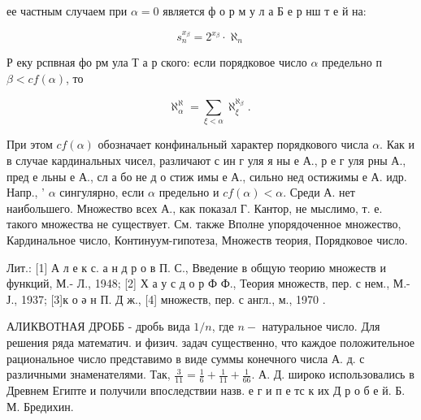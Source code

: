 \documentclass[10pt]{article}
\begin{document}
ее частным случаем при $\alpha=0$ является ф о р м у л а Б е р нш т е й на:



\[

s_{n}^{x_{\beta}}=2^{x_{\beta}} \cdot \aleph_{n}

\]



Р еку рспвная фо рм ула Т а р ского: если порядковое число $\alpha$ предельно п $\beta<c f(\alpha)$, то



\[

\aleph_{\alpha}^{\aleph}=\sum_{\xi<\alpha} \aleph_{\xi}^{\aleph_{\beta}} \text {. }

\]



При этом $c f(\alpha)$ обозначает конфинальный характер порядкового числа $\alpha$. Как и в случае кардинальных чисел, различают с ин г уля я ны е А., р е г уля рны А., пред е льны е А., сл а бо не д о стиж имы е А., сильно нед остижимы е А. идр. Напр., ' $\alpha$ сингулярно, если $\alpha$ предельно и $c f(\alpha)<\alpha$. Среди А. нет наибольшего. Множество всех А., как показал Г. Кантор, не мыслимо, т. е. такого множества не существует. См. также Вполне упорядоченное множество, Кардинальное число, Континуум-гипотеза, Множеств теория, Порядковое число.



Лит.: [1] А л е к с. а н д р о в П. С., Введение в общую теорию множеств и функций, М.- Л., 1948; [2] Х а у с д о р Ф Ф., Теория множеств, пер. с нем., М.- Ј., 1937; [3]к о ә н П. Д ж., [4] множеств, пер. с англ., м., 1970 .



АЛИКВОТНАЯ ДРОББ - дробь вида $1 / n$, где $n-$ натуральное число. Для решения ряда математич. и физич. задач существенно, что каждое положительное рациональное число представимо в виде суммы конечного числа А. д. с различными знаменателями. Так, $\frac{3}{11}=\frac{1}{6}+\frac{1}{11}+\frac{1}{66}$. А. Д. широко использовались в Древнем Египте и получили впоследствии назв. е г и п е тс к их Д р о б е й. Б. М. Бредихин.
\end{document}
